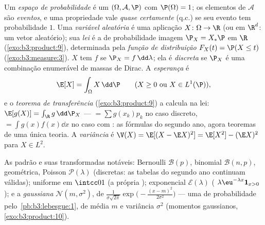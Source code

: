 \begin{definition}\label{def:b3:probability:space}
Um \emph{espaço de probabilidade} é um
 $(\Omega, \mathcal A, \P)$ com $\P(\Omega) =
1$; os elementos de $\mathcal A$ são \emph{eventos}, e
uma propriedade vale \emph{quase certamente} (q.c.) se seu evento tem
probabilidade $1$. Uma \emph{variável aleatória} é uma aplicação  $X \colon \Omega \to \R$ (ou em $\R^d$: um vetor
aleatório); sua \emph{lei} é a
 de probabilidade imagem $\P_X =
X_*\P$ em $\R$ (\cref{exo:b3:product:9}),
determinada pela \emph{função de distribuição} $F_X(t) = \P(X \leq t)$
(\cref{exo:b3:measure:3}). $X$ tem \emph{} $f$ se $\P_X = f\,\dd\lambda$; ela é
\emph{discreta} se $\P_X$ é uma combinação enumerável de massas de
Dirac. A \emph{esperança} é
\[
\E[X] = \int_\Omega X\,\dd\P
\qquad (X \geq 0 \text{ ou } X \in L^1(\P)),
\]
e o \emph{teorema de transferência} (\cref{exo:b3:product:9}) a calcula na lei:
$\E[g(X)] = \int_\R g\,\dd\P_X$ --- $= \sum g(x_k)p_k$ no caso discreto, $= \int
g(x)f(x)\dd x$ no caso com : as fórmulas
do segundo ano, agora teoremas de uma única teoria. A \emph{variância} é
$\V(X) =
\E[(X - \E X)^2] = \E[X^2] - (\E X)^2$ para $X \in L^2$.
\end{definition}

\begin{example}\label{ex:b3:probability:laws}
As  padrão e suas transformadas notáveis: Bernoulli $\mathcal B(p)$, binomial
$\mathcal B(n, p)$, geométrica, Poisson $\mathcal P(\lambda)$ (discretas: as tabelas do segundo ano
continuam válidas); uniforme em $\intcc01$ (a própria );
exponencial $\mathcal E(\lambda)$ ( $\lambda\eu^{-\lambda x}\mathbf 1_{x>0}$); e a \emph{gaussiana} $\mathcal N(m, \sigma^2)$, de  $\frac1{\sigma\sqrt{2\pi}}\exp\bigl(-\frac{(x -
m)^2}{2\sigma^2}\bigr)$ --- uma  de probabilidade
pelo~\cref{pb:b3:lebesgue:1}, de média $m$ e variância $\sigma^2$ (momentos
gaussianos, \cref{exo:b3:product:10}).
\end{example}

